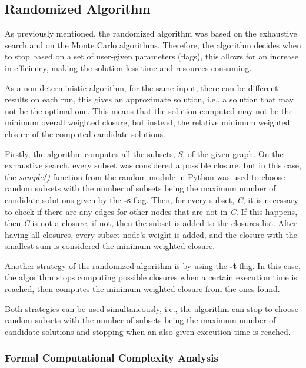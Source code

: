 \documentclass[...]{revdetua}
\begin{document}
\subsection{Randomized Algorithm}

As previously mentioned, the randomized algorithm was based on the exhaustive search and on the Monte Carlo algorithms. Therefore, the algorithm decides when to stop based on a set of user-given parameters (flags), this allows for an increase in efficiency, making the solution less time and resources consuming.

As a non-deterministic algorithm, for the same input, there can be different results on each run, this gives an approximate solution, i.e., a solution that may not be the optimal one. This means that the solution computed may not be the minimum overall weighted closure, 
but instead, the relative minimum weighted closure of the computed candidate solutions.

Firstly, the algorithm computes all the subsets, \textit{S}, of the given graph. On the exhaustive search, every subset was considered a possible closure, but in this case, the \textit{sample()}\cite{random} function from the random module in Python was used to choose random subsets with the number of subsets being the maximum number of candidate solutions given by the \textbf{-s} flag. Then, for every subset, \textit{C}, it is necessary to check if there are any edges for other nodes that are not in \textit{C}. If this happens, then \textit{C} is not a closure, if not, then the subset is added to the closures list. After having all closures, every subset node’s weight is added, and the closure with the smallest sum is considered the minimum weighted closure.

Another strategy of the randomized algorithm is by using the \textbf{-t} flag. In this case, the algorithm stops computing possible closures when a certain execution time is reached, then computes the minimum weighted closure from the ones found.

Both strategies can be used simultaneously, i.e., the algorithm can stop to choose random subsets with the number of subsets being the maximum number of candidate solutions and stopping when an also given execution time is reached.


\subsubsection{Formal Computational Complexity Analysis}
\end{document}
